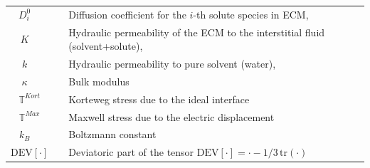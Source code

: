 \documentclass[runningheads]{llncs}
\newcommand{\F}{\ensuremath{\mathbb{F}}}
\begin{document}
\begin{table}[h!]
\begin{tabular}{c  l}
	$D^0_i\qquad$ & Diffusion coefficient for the $i$-th solute species in ECM,\\
	$K\qquad$ &  Hydraulic permeability of the ECM to the interstitial fluid (solvent+solute),\\
	$k\qquad$ &  Hydraulic  permeability  to  pure  solvent (water),\\
	$\kappa\qquad$ & Bulk modulus\\
	$\mathbb{T}^{Kort}\quad$ & Korteweg stress due to the ideal interface\\
	$\mathbb{T}^{Max}\quad$ & Maxwell stress due to the electric displacement\\
	$k_B\qquad$ & Boltzmann constant\\
	$\text{DEV}\left[\cdot\right]\quad$ & Deviatoric part of the tensor $\text{DEV}\left[\cdot\right] = \cdot-1/3\, \text{tr}(\cdot)$
\end{tabular}	
\end{table}
\end{document}
